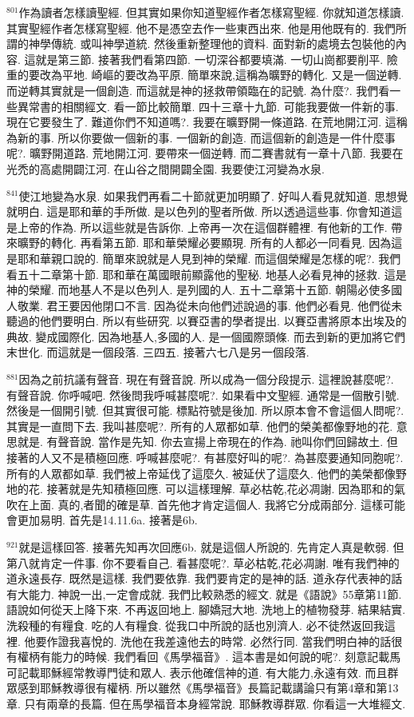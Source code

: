 \documentclass{book}
\begin{document}
$^{801}$作為讀者怎樣讀聖經.
但其實如果你知道聖經作者怎樣寫聖經.
你就知道怎樣讀.
其實聖經作者怎樣寫聖經.
他不是憑空去作一些東西出來.
他是用他既有的.
我們所謂的神學傳統.
或叫神學道統.
然後重新整理他的資料.
面對新的處境去包裝他的內容.
這就是第三節.
接著我們看第四節.
一切深谷都要填滿.
一切山崗都要削平.
險重的要改為平地.
崎嶇的要改為平原.
簡單來說,這稱為曠野的轉化.
又是一個逆轉.
而逆轉其實就是一個創造.
而這就是神的拯救帶領臨在的記號.
為什麼?.
我們看一些異常書的相關經文.
看一節比較簡單.
四十三章十九節.
可能我要做一件新的事.
現在它要發生了.
難道你們不知道嗎?.
我要在曠野開一條道路.
在荒地開江河.
這稱為新的事.
所以你要做一個新的事.
一個新的創造.
而這個新的創造是一件什麼事呢?.
曠野開道路.
荒地開江河.
要帶來一個逆轉.
而二賽書就有一章十八節.
我要在光禿的高處開闢江河.
在山谷之間開闢全園.
我要使江河變為水泉.

$^{841}$使江地變為水泉.
如果我們再看二十節就更加明顯了.
好叫人看見就知道.
思想覺就明白.
這是耶和華的手所做.
是以色列的聖者所做.
所以透過這些事.
你會知道這是上帝的作為.
所以這些就是告訴你.
上帝再一次在這個群體裡.
有他新的工作.
帶來曠野的轉化.
再看第五節.
耶和華榮耀必要顯現.
所有的人都必一同看見.
因為這是耶和華親口說的.
簡單來說就是人見到神的榮耀.
而這個榮耀是怎樣的呢?.
我們看五十二章第十節.
耶和華在萬國眼前顯露他的聖秘.
地基人必看見神的拯救.
這是神的榮耀.
而地基人不是以色列人.
是列國的人.
五十二章第十五節.
朝陽必使多國人敬業.
君王要因他閉口不言.
因為從未向他們述說過的事.
他們必看見.
他們從未聽過的他們要明白.
所以有些研究.
以賽亞書的學者提出.
以賽亞書將原本出埃及的典故.
變成國際化.
因為地基人,多國的人.
是一個國際頭條.
而去到新的更加將它們末世化.
而這就是一個段落.
三四五.
接著六七八是另一個段落.

$^{881}$因為之前抗議有聲音.
現在有聲音說.
所以成為一個分段提示.
這裡說甚麼呢?.
有聲音說.
你呼喊吧.
然後問我呼喊甚麼呢?.
如果看中文聖經.
通常是一個散引號.
然後是一個開引號.
但其實很可能.
標點符號是後加.
所以原本會不會這個人問呢?.
其實是一直問下去.
我叫甚麼呢?.
所有的人眾都如草.
他們的榮美都像野地的花.
意思就是.
有聲音說.
當作是先知.
你去宣揚上帝現在的作為.
祂叫你們回歸故土.
但接著的人又不是積極回應.
呼喊甚麼呢?.
有甚麼好叫的呢?.
為甚麼要通知同胞呢?.
所有的人眾都如草.
我們被上帝延伐了這麼久.
被延伏了這麼久.
他們的美榮都像野地的花.
接著就是先知積極回應.
可以這樣理解.
草必枯乾,花必凋謝.
因為耶和的氣吹在上面.
真的,者聞的確是草.
首先他才肯定這個人.
我將它分成兩部分.
這樣可能會更加易明.
首先是14.11.6a.
接著是6b.

$^{921}$就是這樣回答.
接著先知再次回應6b.
就是這個人所說的.
先肯定人真是軟弱.
但第八就肯定一件事.
你不要看自己.
看甚麼呢?.
草必枯乾,花必凋謝.
唯有我們神的道永遠長存.
既然是這樣.
我們要依靠.
我們要肯定的是神的話.
道永存代表神的話有大能力.
神說一出,一定會成就.
我們比較熟悉的經文.
就是《語說》55章第11節.
語說如何從天上降下來.
不再返回地上.
腳嬌冠大地.
洗地上的植物發芽.
結果結實.
洗殺種的有糧食.
吃的人有糧食.
從我口中所說的話也別濟人.
必不徒然返回我這裡.
他要作證我喜悅的.
洗他在我差遠他去的時常.
必然行同.
當我們明白神的話很有權柄有能力的時候.
我們看回《馬學福音》.
這本書是如何說的呢?.
刻意記載馬可記載耶穌經常教導門徒和眾人.
表示他確信神的道.
有大能力,永遠有效.
而且群眾感到耶穌教導很有權柄.
所以雖然《馬學福音》長篇記載講論只有第4章和第13章.
只有兩章的長篇.
但在馬學福音本身經常說.
耶穌教導群眾.
你看這一大堆經文.
\end{document}
